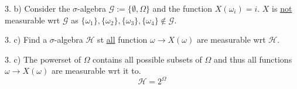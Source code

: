 \documentclass[11pt,a4paper]{article}
\begin{document}
\begin{answer}{3. b)}
  Consider the $\sigma$-algebra $\mathcal{G}:=\{\emptyset,\Omega\}$ and the function $X(\omega_i)=i$. $X$ is \underline{not} measurable wrt $\mathcal{G}$ as $\{\omega_1\},\{\omega_2\},\{\omega_3\},\{\omega_4\}\not\in\mathcal{G}$.
\end{answer}

\begin{question}{3. c)}
  Find a $\sigma$-algebra $\mathcal{H}$ st \underline{all} function $\omega\to X(\omega)$ are measurable wrt $\mathcal{H}$.
\end{question}

\begin{answer}{3. c)}
  The powerset of $\Omega$ contains all possible subsets of $\Omega$ and thus all functions $\omega\to X(\omega)$ are measurable wrt it to.
  \[ \mathcal{H}=2^\Omega \]
\end{answer}
\end{document}
